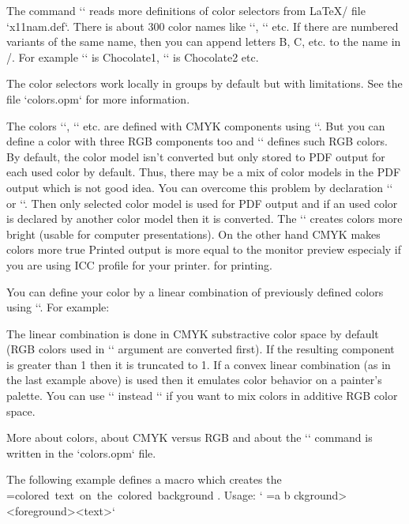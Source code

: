 {\new
The command `\morecolors` reads more definitions of color selectors 
from \LaTeX/ file `x11nam.def`. There is about 300 color names like 
`\DeepPink`, `\Chocolate` etc. If there are numbered variants of the same
name, then you can append letters B, C, etc. to the name in \OpTeX/. For example 
`\Chocolate` is Chocolate1, `\ChocolateB` is Chocolate2 etc.

\new
The color selectors work locally in groups by default but with limitations. See 
the file `colors.opm` for more information.

The colors `\Blue`, `\Cyan` etc. are defined with CMYK components using `\setcmykcolor`.
But you can define a color with three RGB components too and `\morecolors`
defines such RGB colors. By default, the color model isn't converted but only stored to
PDF output for each used color by default. Thus, there may be a mix of color
models in the PDF output which is not good idea. You can overcome this
problem by declaration `\onlyrgb` or `\onlycmyk`. Then only selected color
model is used for PDF output and if an used color is declared by another color
model then it is converted.
The `\onlyrgb` creates colors more bright (usable for computer
presentations). On the other hand CMYK makes colors more true\fnote
{Printed output is more equal to the monitor preview especialy if you are
using ICC profile for your printer.} 
for printing.

\new
You can define your color by a linear combination of previously defined colors using
``. For example:

\begtt
{} \myCyan {.3\Green + .5\Blue}  %
 \DarkBlue {\Blue + .4\Black}  %
 \myGreen{\Cyan+\Yellow}       %
{} \MyColor {.3\Orange+.5\Green+.2\Yellow}
\endtt
%
The linear combination is done in CMYK substractive color space by default 
(RGB colors used in `` argument are converted first). 
If the resulting component is greater than 1 then it is truncated to 1.
If a convex linear combination (as in the last example above) is used then it
emulates color behavior on a painter's palette.
You can use `\rgbcolordef` instead `` if you want to mix colors 
in additive RGB color space.

More about colors, about CMYK versus RGB and
about the `` command is written in the `colors.opm` file.

\def\coloron#1#2#3{%
   \setbox0=\hbox{#3}\leavevmode
   {\localcolor\rlap{#1\strut \vrule width\wd0}#2}%
}
The following example defines a macro which creates the
\coloron\Yellow\Brown{colored text on the colored background}. Usage:
`\coloron<background><foreground>{<text>}`

}
